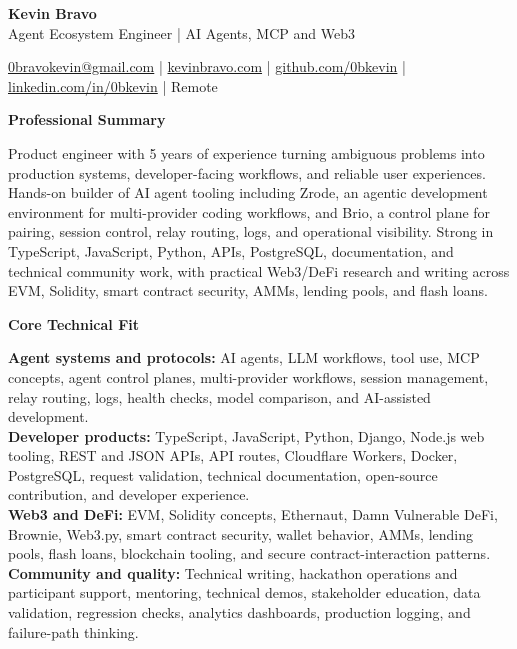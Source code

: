 \documentclass[10pt]{article}
\newcommand{\sectiontitle}[1]{%
    \vspace{3pt}
    \begin{center}
        \textbf{#1}
    \end{center}
    \vspace{-5pt}
}
\begin{document}
\raggedright

\begin{center}
    {\LARGE \textbf{Kevin Bravo}}\\
    Agent Ecosystem Engineer | AI Agents, MCP and Web3 \\
    \hrulefill
\end{center}

\begin{center}
    \href{mailto:0bravokevin@gmail.com}{0bravokevin@gmail.com}
    | \href{https://kevinbravo.com}{kevinbravo.com}
    | \href{https://github.com/0bkevin}{github.com/0bkevin}
    | \href{https://www.linkedin.com/in/0bkevin/}{linkedin.com/in/0bkevin}
    | Remote
\end{center}

\fontsize{9.65}{10.65}\selectfont

\sectiontitle{Professional Summary}
Product engineer with 5 years of experience turning ambiguous problems into production systems, developer-facing workflows, and reliable user experiences. Hands-on builder of AI agent tooling including Zrode, an agentic development environment for multi-provider coding workflows, and Brio, a control plane for pairing, session control, relay routing, logs, and operational visibility. Strong in TypeScript, JavaScript, Python, APIs, PostgreSQL, documentation, and technical community work, with practical Web3/DeFi research and writing across EVM, Solidity, smart contract security, AMMs, lending pools, and flash loans.

\sectiontitle{Core Technical Fit}
\textbf{Agent systems and protocols:} AI agents, LLM workflows, tool use, MCP concepts, agent control planes, multi-provider workflows, session management, relay routing, logs, health checks, model comparison, and AI-assisted development. \\
\textbf{Developer products:} TypeScript, JavaScript, Python, Django, Node.js web tooling, REST and JSON APIs, API routes, Cloudflare Workers, Docker, PostgreSQL, request validation, technical documentation, open-source contribution, and developer experience. \\
\textbf{Web3 and DeFi:} EVM, Solidity concepts, Ethernaut, Damn Vulnerable DeFi, Brownie, Web3.py, smart contract security, wallet behavior, AMMs, lending pools, flash loans, blockchain tooling, and secure contract-interaction patterns. \\
\textbf{Community and quality:} Technical writing, hackathon operations and participant support, mentoring, technical demos, stakeholder education, data validation, regression checks, analytics dashboards, production logging, and failure-path thinking.
\end{document}
